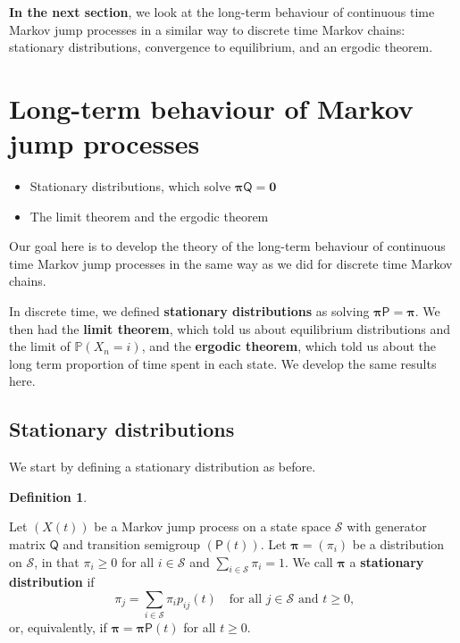 \documentclass[
  a4paper,
]{article}
\providecommand{\tightlist}{%
  \setlength{\itemsep}{0pt}\setlength{\parskip}{0pt}}
\theoremstyle{definition}
\newtheorem{definition}{Definition}[section]
\theoremstyle{definition}
\theoremstyle{definition}
\theoremstyle{remark}
\begin{document}
\textbf{In the next section}, we look at the long-term behaviour of continuous time Markov jump processes in a similar way to discrete time Markov chains: stationary distributions, convergence to equilibrium, and an ergodic theorem.

\hypertarget{S20-long-term-jump}{%
\section{Long-term behaviour of Markov jump processes}\label{S20-long-term-jump}}

\begin{itemize}
\tightlist
\item
  Stationary distributions, which solve \(\boldsymbol\pi\mathsf Q = \mathbf 0\)
\item
  The limit theorem and the ergodic theorem
\end{itemize}

Our goal here is to develop the theory of the long-term behaviour of continuous time Markov jump processes in the same way as we did for discrete time Markov chains.

In discrete time, we defined \textbf{stationary distributions} as solving \(\boldsymbol\pi\mathsf P = \boldsymbol\pi\). We then had the \textbf{limit theorem}, which told us about equilibrium distributions and the limit of \(\mathbb P(X_n = i)\), and the \textbf{ergodic theorem}, which told us about the long term proportion of time spent in each state. We develop the same results here.

\hypertarget{stationary-jump}{%
\subsection{Stationary distributions}\label{stationary-jump}}

We start by defining a stationary distribution as before.

\begin{definition}
\protect\hypertarget{def:statdist2}{}\label{def:statdist2}

Let \((X(t))\) be a Markov jump process on a state space \(\mathcal S\) with generator matrix \(\mathsf Q\) and transition semigroup \((\mathsf P(t))\).
Let \(\boldsymbol \pi = (\pi_i)\) be a distribution on \(\mathcal S\), in that \(\pi_i \geq 0\) for all \(i \in \mathcal S\) and \(\sum_{i \in \mathcal S} \pi_i = 1\). We call \(\boldsymbol \pi\) a \textbf{stationary distribution} if
\[ \pi_j = \sum_{i\in \mathcal S} \pi_i p_{ij}(t) \quad \text{for all $j \in \mathcal S$ and $t \geq 0$,} \]
or, equivalently, if \(\boldsymbol \pi = \boldsymbol \pi\mathsf P(t)\) for all \(t \geq 0\).

\end{definition}
\end{document}
